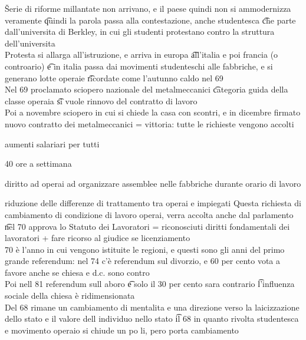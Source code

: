 \documentclass[12pt]{article}
\begin{document}
\v

Serie di riforme millantate non arrivano, e il paese quindi non si ammodernizza veramente \t quindi la parola passa alla contestazione, anche studentesca \t che parte dall'universita di Berkley, in cui gli studenti protestano contro la struttura dell'universita \\
Protesta si allarga all'istruzione, e arriva in europa \t all'italia e poi francia (o controario) \t e in italia passa dai movimenti studenteschi alle fabbriche, e si generano lotte operaie \t ricordate come l'autunno caldo nel 69 \\
Nel 69 proclamato sciopero nazionale del metalmeccanici \t categoria guida della classe operaia \t si vuole rinnovo del contratto di lavoro \\
Poi a novembre sciopero in cui si chiede la casa con scontri, e in dicembre firmato nuovo contratto dei metalmeccanici = vittoria: tutte le richieste vengono accolti
\bi
  \item aumenti salariari per tutti
  \item 40 ore a settimana
  \item diritto ad operai ad organizzare assemblee nelle fabbriche durante orario di lavoro
  \item riduzione delle differenze di trattamento tra operai e impiegati
\ei
Questa richiesta di cambiamento di condizione di lavoro operai, verra accolta anche dal parlamento \t nel 70 approva lo Statuto dei Lavoratori = riconosciuti diritti fondamentali dei lavoratori + fare ricorso al giudice se licenziamento \\
70 è l'anno in cui vengono istituite le regioni, e questi sono gli anni del primo grande referendum: nel 74 c'è referendum sul divorzio, e 60 per cento vota a favore anche se chiesa e d.c. sono contro \\
Poi nell 81 referendum sull aboro \t e solo il 30 per cento sara contrario \t l'influenza sociale della chiesa è ridimensionata \\
Del 68 rimane un cambiamento di mentalita e una direzione verso la laicizzazione dello stato e il valore dell individuo nello stato \t il 68 in quanto rivolta studentesca e movimento operaio si chiude un po li, pero porta cambiamento
\end{document}
